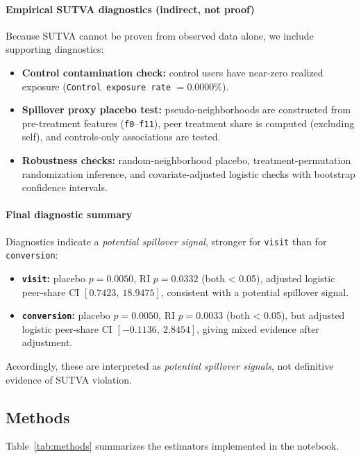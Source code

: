 \documentclass[journal,11pt,onecolumn]{IEEEtran}
\begin{document}
\paragraph{Empirical SUTVA diagnostics (indirect, not proof)}
Because SUTVA cannot be proven from observed data alone, we include supporting
diagnostics:
\begin{itemize}
    \item \textbf{Control contamination check:}
          control users have near-zero realized exposure (\texttt{Control exposure rate}
          \(=0.0000\%\)).
    \item \textbf{Spillover proxy placebo test:}
          pseudo-neighborhoods are constructed from pre-treatment features
          (\texttt{f0}--\texttt{f11}), peer treatment share is computed (excluding
          self), and controls-only associations are tested.
    \item \textbf{Robustness checks:}
          random-neighborhood placebo, treatment-permutation randomization inference,
          and covariate-adjusted logistic checks with bootstrap confidence intervals.
\end{itemize}

\paragraph{Final diagnostic summary}
Diagnostics indicate a \emph{potential spillover signal}, stronger for
\texttt{visit} than for \texttt{conversion}:
\begin{itemize}
    \item \textbf{\texttt{visit}:} placebo \(p=0.0050\), RI \(p=0.0332\) (both < 0.05),
          adjusted logistic peer-share CI \([0.7423,\ 18.9475]\), consistent with a
          potential spillover signal.
    \item \textbf{\texttt{conversion}:} placebo \(p=0.0050\), RI \(p=0.0033\) (both < 0.05),
          but adjusted logistic peer-share CI \([-0.1136,\ 2.8454]\), giving mixed
          evidence after adjustment.
\end{itemize}
Accordingly, these are interpreted as \emph{potential spillover signals}, not
definitive evidence of SUTVA violation.

\subsection{Methods}

Table~\ref{tab:methods} summarizes the estimators implemented in the notebook.
\end{document}
